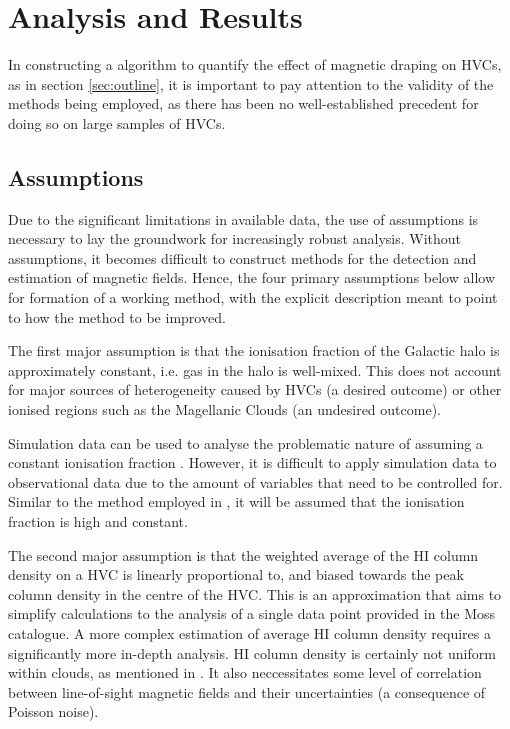 \chapter{Analysis and Results}
\label{cha:derivation}

In constructing a algorithm to quantify the effect of magnetic draping on HVCs, as in section \ref{sec:outline}, it is important to pay attention to the validity of the methods being employed, as there has been no well-established precedent for doing so on large samples of HVCs.

\section{Assumptions}
\label{sec:assumptions}

Due to the significant limitations in available data, the use of assumptions is necessary to lay the groundwork for increasingly robust analysis. Without assumptions, it becomes difficult to construct methods for the detection and estimation of magnetic fields. Hence, the four primary assumptions below allow for formation of a working method, with the explicit description meant to point to how the method to be improved.


The first major assumption is that the ionisation fraction of the Galactic halo is approximately constant, i.e. gas in the halo is well-mixed. This does not account for major sources of heterogeneity caused by HVCs (a desired outcome) or other ionised regions such as the Magellanic Clouds (an undesired outcome).


Simulation data can be used to analyse the problematic nature of assuming a constant ionisation fraction \citep{ID23}. However, it is difficult to apply simulation data to observational data due to the amount of variables that need to be controlled for. Similar to the method employed in \cite{ID23}, it will be assumed that the ionisation fraction is high and constant.


The second major assumption is that the weighted average of the HI column density on a HVC is linearly proportional to, and biased towards the peak column density in the centre of the HVC. This is an approximation that aims to simplify calculations to the analysis of a single data point provided in the Moss catalogue. A more complex estimation of average HI column density requires a significantly more in-depth analysis. HI column density is certainly not uniform within clouds, as mentioned in \cite{ID69}. It also neccessitates some level of correlation between line-of-sight magnetic fields and their uncertainties (a consequence of Poisson noise).


